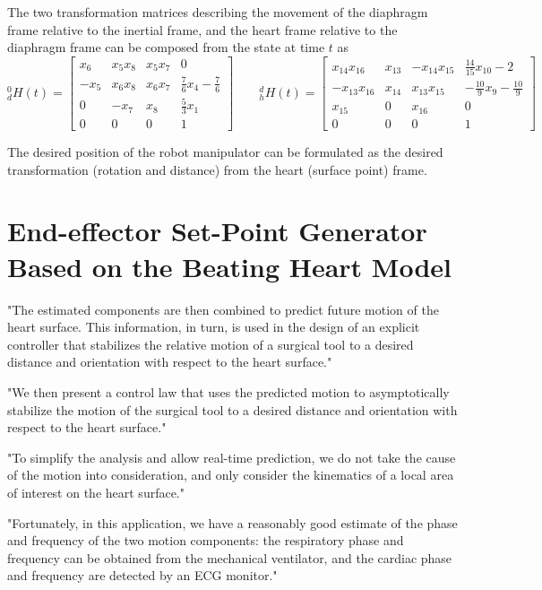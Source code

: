 The two transformation matrices describing the movement of the diaphragm frame relative to the inertial frame, and the heart frame relative to the diaphragm frame can be composed from the state at time $t$ as \citep{bib:heart_model}
\begin{equation}
^0_dH(t) = 
\begin{bmatrix}
x_6 & x_5 x_8 & x_5 x_7 & 0\\
-x_5 & x_6 x_8 & x_6 x_7 & \tfrac{7}{6} x_4 - \tfrac{7}{6} \\
0 & -x_7 & x_8 & \tfrac{5}{3}x_1\\
0 & 0 & 0 & 1
\end{bmatrix}
\quad\quad
^d_hH(t) = 
\begin{bmatrix}
x_{14} x_{16} & x_{13} & -x_{14} x_{15} & \tfrac{14}{15} x_{10}-2\\
-x_{13}  x_{16} & x_{14} & x_{13} x_{15} & -\tfrac{10}{9} x_9 - \tfrac{10}{9}\\
x_{15} & 0 & x_{16} & 0\\
0 & 0 & 0 & 1
\end{bmatrix}
\end{equation}

The desired position of the robot manipulator can be formulated as the desired transformation (rotation and distance) from the heart (surface point) frame.


\section{End-effector Set-Point Generator Based on the Beating Heart Model}
"The estimated components are then combined to predict future motion of the heart surface. This information, in turn, is used in the design of an explicit controller that stabilizes the relative motion of a surgical tool to a desired distance and orientation with respect to the heart surface."

"We then present a control law that uses the predicted motion to asymptotically stabilize the motion of the surgical tool to a desired distance and orientation with respect to the heart surface."

"To simplify the analysis and allow real-time prediction, we do not take the cause of the motion into consideration, and only consider the kinematics of a local area of interest on the heart surface."

"Fortunately, in this application, we have a reasonably good estimate of the phase and frequency of the two motion components: the respiratory phase and frequency can be obtained from the mechanical ventilator, and the cardiac phase and frequency are detected by an ECG monitor."

